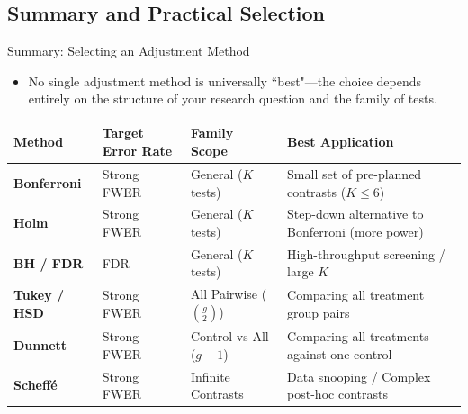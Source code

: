 \subsection{Summary and Practical Selection}

\begin{frame}[allowframebreaks]{Summary: Selecting an Adjustment Method}
  \begin{itemize}
    \item No single adjustment method is universally ``best"---the choice depends entirely on the structure of your research question and the family of tests.
  \end{itemize}

\begin{table}
\centering
{}
\begin{tabular}{l l l p{3.3cm}}
  \hline
  \textbf{Method} & \textbf{Target Error Rate} & \textbf{Family Scope} & \textbf{Best Application} \\
  \hline
  \textbf{Bonferroni} & Strong FWER & General ($K$ tests) & Small set of pre-planned contrasts ($K \le 6$) \\
  \textbf{Holm} & Strong FWER & General ($K$ tests) & Step-down alternative to Bonferroni (more power) \\
  \textbf{BH / FDR} & FDR & General ($K$ tests) & High-throughput screening / large $K$ \\
  \textbf{Tukey / HSD} & Strong FWER & All Pairwise ($\binom{g}{2}$) & Comparing all treatment group pairs \\
  \textbf{Dunnett} & Strong FWER & Control vs All ($g-1$) & Comparing all treatments against one control \\
  \textbf{Scheffé} & Strong FWER & Infinite Contrasts & Data snooping / Complex post-hoc contrasts \\
  \hline
\end{tabular}
\end{table}


\end{frame}
